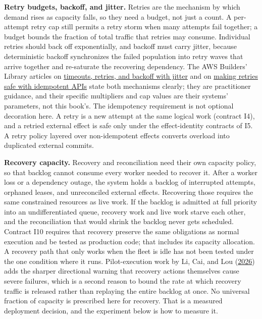 \textbf{Retry budgets, backoff, and jitter.} Retries are the mechanism by which demand rises as capacity falls, so they need a budget, not just a count. A per-attempt retry cap still permits a retry storm when many attempts fail together; a budget bounds the fraction of total traffic that retries may consume. Individual retries should back off exponentially, and backoff must carry jitter, because deterministic backoff synchronizes the failed population into retry waves that arrive together and re-saturate the recovering dependency. The AWS Builders' Library articles on \href{https://aws.amazon.com/builders-library/timeouts-retries-and-backoff-with-jitter/}{timeouts, retries, and backoff with jitter} and on \href{https://aws.amazon.com/builders-library/making-retries-safe-with-idempotent-APIs/}{making retries safe with idempotent APIs} state both mechanisms clearly; they are practitioner guidance, and their specific multipliers and cap values are their systems' parameters, not this book's. The idempotency requirement is not optional decoration here. A retry is a new attempt at the same logical work (contract I4), and a retried external effect is safe only under the effect-identity contracts of I5. A retry policy layered over non-idempotent effects converts overload into duplicated external commits.

\textbf{Recovery capacity.} Recovery and reconciliation need their own capacity policy, so that backlog cannot consume every worker needed to recover it. After a worker loss or a dependency outage, the system holds a backlog of interrupted attempts, orphaned leases, and unreconciled external effects. Recovering those requires the same constrained resources as live work. If the backlog is admitted at full priority into an undifferentiated queue, recovery work and live work starve each other, and the reconciliation that would shrink the backlog never gets scheduled. Contract I10 requires that recovery preserve the same obligations as normal execution and be tested as production code; that includes its capacity allocation. A recovery path that only works when the fleet is idle has not been tested under the one condition where it runs. Pilot-execution work by Li, Cai, and Lou (\href{https://www.usenix.org/conference/nsdi26/presentation/li-zhenyu}{2026}) adds the sharper directional warning that recovery actions themselves cause severe failures, which is a second reason to bound the rate at which recovery traffic is released rather than replaying the entire backlog at once. No universal fraction of capacity is prescribed here for recovery. That is a measured deployment decision, and the experiment below is how to measure it.


